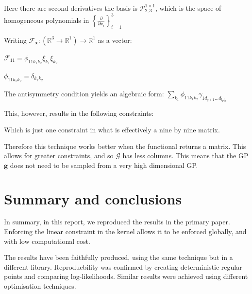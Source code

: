 \documentclass[12pt,a4paper,twoside]{report}
\theoremstyle{definition}
\begin{document}
Here there are second derivatives the basis is $\mathcal P_{2,3}^{1\times 1}$, which is the space of homogeneous polynomials in $\left\{\frac{\partial}{\partial x_i}\right\}_{i=1}^3$

Writing $\mathscr F_\mathbf x:(\mathbb{R}^3\to\mathbb{R}^1)\to \mathbb{R}^1$ as a vector:

$\mathscr F_{11} = \phi_{11k_1k_2}\xi_{k_1}\xi_{k_2}$

$\phi_{11k_1k_2} = \delta_{k_1k_2}$

The antisymmetry condition yields an algebraic form:
$\sum_{k_1}\phi_{11k_1k_2} \gamma_{1d_{q+1}\dots d_{l_1l_2}}$

This, however, results in the following constraints:

Which is just one constraint in what is effectively a nine by nine matrix.

Therefore this technique works better when the functional returns a matrix. This allows for greater constraints, and so $\mathcal G$ has less columns. This means that the GP $\mathbf g$ does not need to be sampled from a very high dimensional GP.

\chapter{Summary and conclusions}

In summary, in this report, we reproduced the results in the primary paper. Enforcing the linear constraint in the kernel allows it to be enforced globally, and with low computational cost.

The results have been faithfully produced, using the same technique but in a different library. Reproducbility was confirmed by creating deterministic regular points and comparing log-likelihoods. Similar results were achieved using different optimisation techniques.

\label{lastcontentpage} %

\printbibliography

\appendix
\end{document}
